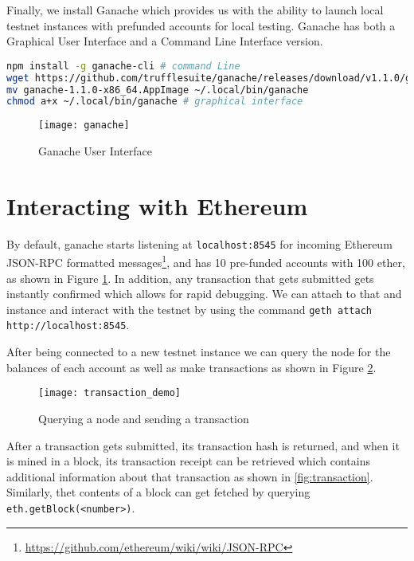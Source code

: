 Finally, we install Ganache which provides us with the ability to launch local testnet instances with prefunded accounts for local testing. Ganache has both a Graphical User Interface and a Command Line Interface version.

\begin{lstlisting}[language=bash,caption={Installing ganache}]
npm install -g ganache-cli # command Line
wget https://github.com/trufflesuite/ganache/releases/download/v1.1.0/ganache-1.1.0-x86_64.AppImage 
mv ganache-1.1.0-x86_64.AppImage ~/.local/bin/ganache
chmod a+x ~/.local/bin/ganache # graphical interface
\end{lstlisting}

\begin{figure}[htb]
    \centering
    \texttt{[image: ganache]}
    \caption{Ganache User Interface}
    \label{fig:ganache}
\end{figure}

\section{Interacting with Ethereum}

By default, ganache starts listening at \texttt{localhost:8545} for incoming Ethereum JSON-RPC formatted messages\footnote{\url{https://github.com/ethereum/wiki/wiki/JSON-RPC}}, and has 10 pre-funded accounts with 100 ether, as shown in Figure \ref{fig:ganache}. In addition, any transaction that gets submitted gets instantly confirmed which allows for rapid debugging. We can attach to that and instance and interact with the testnet by using the command \texttt{geth attach http://localhost:8545}. 

After being connected to a new testnet instance we can query the node for the balances of each account as well as make transactions as shown in Figure \ref{fig:demo}.

\begin{figure}[htb]
    \centering
    \texttt{[image: transaction\_demo]}
    \caption{Querying a node and sending a transaction}
    \label{fig:demo}
\end{figure}

After a transaction gets submitted, its transaction hash is returned, and when it is mined in a block, its transaction receipt can be retrieved which contains additional information about that transaction as shown in \ref{fig:transaction}. Similarly, thet contents of a block can get fetched by querying \texttt{eth.getBlock(<number>)}.

